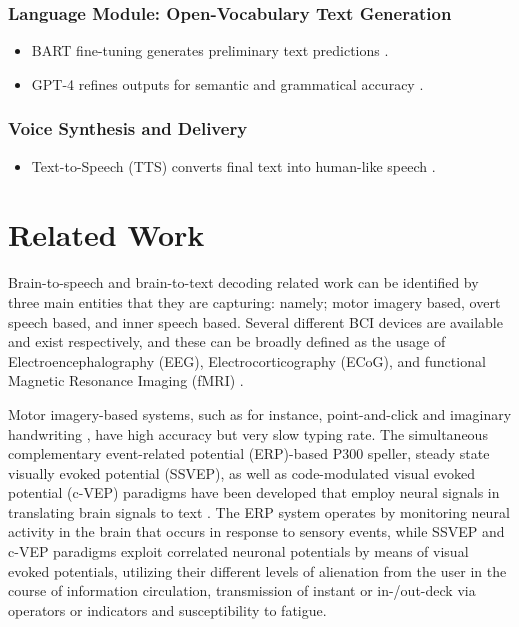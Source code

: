 \documentclass[journal]{IEEEtran}
\begin{document}
\subsubsection{Language Module: Open-Vocabulary Text Generation}
\begin{itemize}
	\item BART fine-tuning generates preliminary text predictions \cite{Lewis2019}.
	\item GPT-4 refines outputs for semantic and grammatical accuracy \cite{OpenAI2023}.
\end{itemize}

\subsubsection{Voice Synthesis and Delivery}
\begin{itemize}
	\item Text-to-Speech (TTS) converts final text into human-like speech \cite{Moses2021}.
\end{itemize}

\section{Related Work}
Brain-to-speech and brain-to-text decoding related work can be identified by three main entities that they are capturing: namely; motor imagery based, overt speech based, and inner speech based. Several different BCI devices are available and exist respectively, and these can be broadly defined as the usage of Electroencephalography (EEG), Electrocorticography (ECoG), and functional Magnetic Resonance Imaging (fMRI) \cite{Panachakel2021}.

Motor imagery-based systems, such as for instance, point-and-click \cite{Jarosiewicz2015} and imaginary handwriting \cite{Willett2021}, have high accuracy but very slow typing rate. The simultaneous complementary event-related potential (ERP)-based P300 speller, steady state visually evoked potential (SSVEP), as well as code-modulated visual evoked potential (c-VEP) paradigms have been developed that employ neural signals in translating brain signals to text \cite{Lee2018}. The ERP system operates by monitoring neural activity in the brain that occurs in response to sensory events, while SSVEP and c-VEP paradigms exploit correlated neuronal potentials by means of visual evoked potentials, utilizing their different levels of alienation from the user in the course of information circulation, transmission of instant or in-/out-deck via operators or indicators and susceptibility to fatigue.
\end{document}

